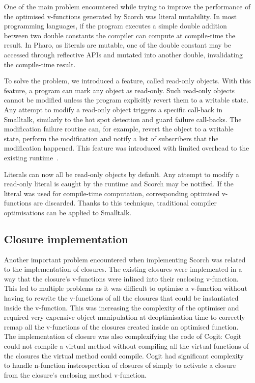 \documentclass[a4paper,12pt,twoside]{../includes/ThesisStyle}
\begin{document}
One of the main problem encountered while trying to improve the performance of the optimised v-functions generated by Scorch was literal mutability. In most programming languages, if the program executes a simple double addition between two double constants the compiler can compute at compile-time the result. In Pharo, as literals are mutable, one of the double constant may be accessed through reflective APIs and mutated into another double, invalidating the compile-time result. 

To solve the problem, we introduced a feature, called read-only objects. With this feature, a program can mark any object as read-only. Such read-only objects cannot be modified unless the program explicitly revert them to a writable state. Any attempt to modify a read-only object triggers a specific call-back in Smalltalk, similarly to the hot spot detection and guard failure call-backs. The modification failure routine can, for example, revert the object to a writable state, perform the modification and notify a list of subscribers that the modification happened. This feature was introduced with limited overhead to the existing runtime~\cite{Bera16b}. 

Literals can now all be read-only objects by default. Any attempt to modify a read-only literal is caught by the runtime and Scorch may be notified. If the literal was used for compile-time computation, corresponding optimised v-functions are discarded. Thanks to this technique, traditional compiler optimisations can be applied to Smalltalk.

\subsection{Closure implementation}

Another important problem encountered when implementing Scorch was related to the implementation of closures. The existing closures were implemented in a way that the closure's v-functions were inlined into their enclosing v-function. This led to multiple problems as it was difficult to optimise a v-function without having to rewrite the v-functions of all the closures that could be instantiated inside the v-function. This was increasing the complexity of the optimiser and required very expensive object manipulation at deoptimisation time to correctly remap all the v-functions of the closures created inside an optimised function. The implementation of closure was also complexifying the code of Cogit: Cogit could not compile a virtual method without compiling all the virtual functions of the closures the virtual method could compile. Cogit had significant complexity to handle n-function instrospection of closures of simply to activate a closure from the closure's enclosing method v-function.
\end{document}
